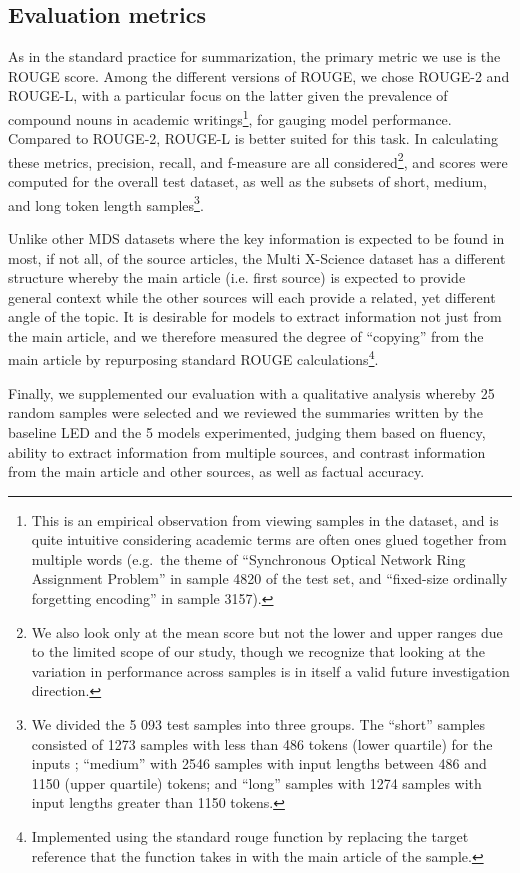 \documentclass[12pt, twocolumn]{article}
\numberwithin{equation}{section}
\begin{document}
\subsection{Evaluation metrics}
\label{ssec:eval-metrics}

As in the standard practice for summarization, the primary metric we use is the ROUGE score.  Among the different versions of ROUGE, we chose ROUGE-2 and ROUGE-L, with a particular focus on the latter given the prevalence of compound nouns in academic writings\footnote{This is an empirical observation from viewing samples in the dataset, and is quite intuitive considering academic terms are often ones glued together from multiple words (e.g.~the theme of ``Synchronous Optical Network Ring Assignment Problem'' in sample 4820 of the test set, and ``fixed-size ordinally forgetting encoding'' in sample 3157).}, for gauging model performance.  Compared to ROUGE-2, ROUGE-L is better suited for this task.  In calculating these metrics, precision, recall, and f-measure are all considered\footnote{We also look only at the mean score but not the lower and upper ranges due to the limited scope of our study, though we recognize that looking at the variation in performance across samples is in itself a valid future investigation direction.}, and scores were computed for the overall test dataset, as well as the subsets of short, medium, and long token length samples\footnote{We divided the 5 093 test samples into three groups.  The “short” samples consisted of 1273 samples with less than 486 tokens (lower quartile) for the inputs ; “medium” with 2546 samples with input lengths between 486 and 1150 (upper quartile) tokens; and “long” samples with 1274 samples with input lengths greater than 1150 tokens.}.

Unlike other MDS datasets where the key information is expected to be found in most, if not all, of the source articles, the Multi X-Science dataset has a different structure whereby the main article (i.e. first source) is expected to provide general context while the other sources will each provide a related, yet different angle of the topic.  It is desirable for models to extract information not just from the main article, and we therefore measured the degree of ``copying'' from the main article by repurposing standard ROUGE calculations\footnote{Implemented using the standard rouge function by replacing the target reference that the function takes in with the main article of the sample.}.

Finally, we supplemented our evaluation with a qualitative analysis whereby 25 random samples were selected and we reviewed the summaries written by the baseline LED and the 5 models experimented, judging them based on fluency, ability to extract information from multiple sources, and contrast information from the main article and other sources, as well as factual accuracy.
\end{document}
